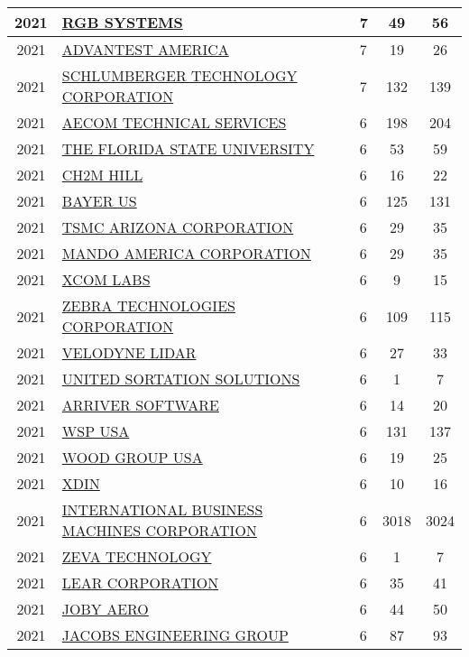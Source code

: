 \documentclass{article}%
\begin{document}
\begin{longtable}{c|p{20em}|p{5em}|c|c}
\hline%
2021&\hyperref[subsec:RGBSYSTEMS]{RGB SYSTEMS}&7&49&56\\%
\hline%
2021&\hyperref[subsec:ADVANTESTAMERICA]{ADVANTEST AMERICA}&7&19&26\\%
\hline%
2021&\hyperref[subsec:SCHLUMBERGERTECHNOLOGYCORPORATION]{SCHLUMBERGER TECHNOLOGY CORPORATION}&7&132&139\\%
\hline%
2021&\hyperref[subsec:AECOMTECHNICALSERVICES]{AECOM TECHNICAL SERVICES}&6&198&204\\%
\hline%
2021&\hyperref[subsec:THEFLORIDASTATEUNIVERSITY]{THE FLORIDA STATE UNIVERSITY}&6&53&59\\%
\hline%
2021&\hyperref[subsec:CH2MHILL]{CH2M HILL}&6&16&22\\%
\hline%
2021&\hyperref[subsec:BAYERUS]{BAYER US}&6&125&131\\%
\hline%
2021&\hyperref[subsec:TSMCARIZONACORPORATION]{TSMC ARIZONA CORPORATION}&6&29&35\\%
\hline%
2021&\hyperref[subsec:MANDOAMERICACORPORATION]{MANDO AMERICA CORPORATION}&6&29&35\\%
\hline%
2021&\hyperref[subsec:XCOMLABS]{XCOM LABS}&6&9&15\\%
\hline%
2021&\hyperref[subsec:ZEBRATECHNOLOGIESCORPORATION]{ZEBRA TECHNOLOGIES CORPORATION}&6&109&115\\%
\hline%
2021&\hyperref[subsec:VELODYNELIDAR]{VELODYNE LIDAR}&6&27&33\\%
\hline%
2021&\hyperref[subsec:UNITEDSORTATIONSOLUTIONS]{UNITED SORTATION SOLUTIONS}&6&1&7\\%
\hline%
2021&\hyperref[subsec:ARRIVERSOFTWARE]{ARRIVER SOFTWARE}&6&14&20\\%
\hline%
2021&\hyperref[subsec:WSPUSA]{WSP USA}&6&131&137\\%
\hline%
2021&\hyperref[subsec:WOODGROUPUSA]{WOOD GROUP USA}&6&19&25\\%
\hline%
2021&\hyperref[subsec:XDIN]{XDIN}&6&10&16\\%
\hline%
2021&\hyperref[subsec:INTERNATIONALBUSINESSMACHINESCORPORATION]{INTERNATIONAL BUSINESS MACHINES CORPORATION}&6&3018&3024\\%
\hline%
2021&\hyperref[subsec:ZEVATECHNOLOGY]{ZEVA TECHNOLOGY}&6&1&7\\%
\hline%
2021&\hyperref[subsec:LEARCORPORATION]{LEAR CORPORATION}&6&35&41\\%
\hline%
2021&\hyperref[subsec:JOBYAERO]{JOBY AERO}&6&44&50\\%
\hline%
2021&\hyperref[subsec:JACOBSENGINEERINGGROUP]{JACOBS ENGINEERING GROUP}&6&87&93\\%

\end{longtable}
\end{document}
